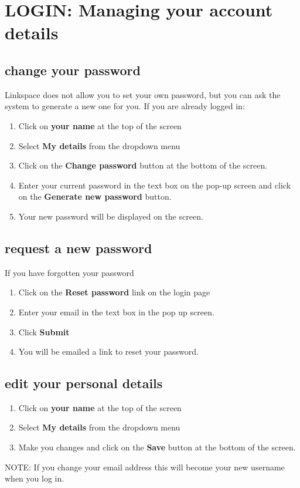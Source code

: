 \documentclass{ctrlo-int-toc}
\begin{document}
\clearpage\section[LOGIN: Managing your account details]{LOGIN: Managing your account details}
\subsection[change your password]{change your password}
Linkspace does not allow you to set your own password, but you can ask the system to generate a new one for you. If you are already logged in:

\begin{enumerate}
\item Click on \textbf{your name} at the top of the screen
\item Select \textbf{My details} from the dropdown menu
\item Click on the \textbf{Change password} button at the bottom of the screen. 
\item Enter your current password in the text box on the pop-up screen and click on the \textbf{Generate new password} button.
\item Your new password will be displayed on the screen. 
\end{enumerate}
\subsection[request a new password]{request a new password}
If you have forgotten your password

\begin{enumerate}
\item Click on the \textbf{Reset password} link on the login page
\item Enter your email in the text box in the pop up screen.
\item Click \textbf{Submit}
\item You will be emailed a link to reset your password. 
\end{enumerate}
\subsection[edit your personal details]{edit your personal details}
\begin{enumerate}
\item Click on \textbf{your name} at the top of the screen
\item Select \textbf{My details} from the dropdown menu
\item Make you changes and click on the \textbf{Save} button at the bottom of the screen. 
\end{enumerate}
\begin{notebox}
NOTE: If you change your email address this will become your new username when you log in. 
\end{notebox}
\end{document}
